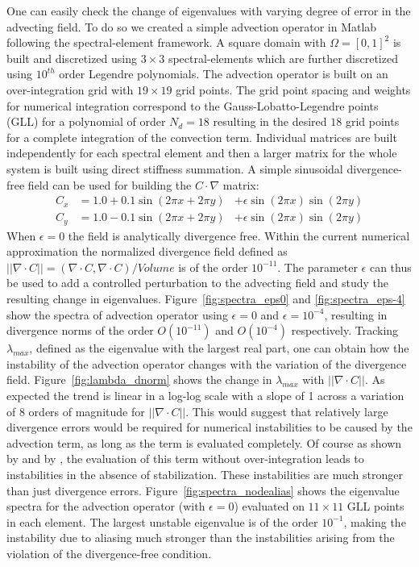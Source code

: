 One can easily check the change of eigenvalues with varying degree of error in the advecting field. To do so we created a simple advection operator in Matlab following the spectral-element framework. A square domain with $\Omega=[0,1]^{2}$ is built and discretized using $3\times3$ spectral-elements which are further discretized using $10^{th}$ order Legendre polynomials. The advection operator is built on an over-integration grid with $19\times19$ grid points. The grid point spacing and weights for numerical integration correspond to the Gauss-Lobatto-Legendre points (GLL) for a polynomial of order $N_{d}=18$ resulting in the desired $18$ grid points for a complete integration of the convection term. Individual matrices are built independently for each spectral element and then a larger matrix for the whole system is built using direct stiffness summation. A simple sinusoidal divergence-free field can be used for building the $C\cdot\nabla$ matrix:
\begin{align}
\label{eqn:convection_op}
C_{x} &= 1.0 + 0.1\sin(2\pi x + 2\pi y) &+\epsilon\sin(2\pi x)\sin(2\pi y) \\
C_{y} &= 1.0 - 0.1\sin(2\pi x + 2\pi y) &+\epsilon\sin(2\pi x)\sin(2\pi y) \nonumber
\end{align}
When $\epsilon=0$ the field is analytically divergence free. Within the current numerical approximation the normalized divergence field defined as $||\nabla\cdot C|| = (\nabla\cdot C,\nabla\cdot C)/Volume$ is of the order $10^{-11}$. The parameter $\epsilon$ can thus be used to add a controlled perturbation to the advecting field and study the resulting change in eigenvalues. Figure~\ref{fig:spectra_eps0} and \ref{fig:spectra_eps-4} show the spectra of advection operator using $\epsilon=0$ and $\epsilon=10^{-4}$, resulting in divergence norms of the order $O(10^{-11})$ and $O(10^{-4})$ respectively. Tracking $\lambda_{max}$, defined as the eigenvalue with the largest real part, one can obtain how the instability of the advection operator changes with the variation of the divergence field. Figure~\ref{fig:lambda_dnorm} shows the change in $\lambda_{max}$ with $||\nabla\cdot C||$. As expected the trend is linear in a log-log scale with a slope of 1 across a variation of 8 orders of magnitude for $||\nabla\cdot C||$. This would suggest that relatively large divergence errors would be required for numerical instabilities to be caused by the advection term, as long as the term is evaluated completely. Of course as shown by \cite{malm13} and by \cite{kirby03}, the evaluation of this term without over-integration leads to instabilities in the absence of stabilization. These instabilities are much stronger than just divergence errors. Figure~\ref{fig:spectra_nodealias} shows the eigenvalue spectra for the advection operator (with $\epsilon=0$) evaluated on $11\times11$ GLL points in each element. The largest unstable eigenvalue is of the order $10^{-1}$, making the instability due to aliasing much stronger than the instabilities arising from the violation of the divergence-free condition.
